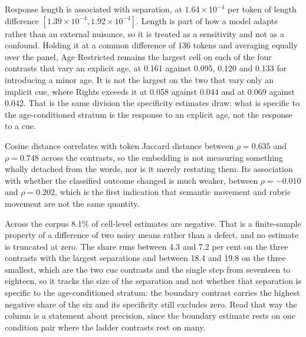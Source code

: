Response length is associated with separation, at $1.64\times10^{-4}$ per token
of length difference $[1.39\times10^{-4}, 1.92\times10^{-4}]$. Length is part of
how a model adapts rather than an external nuisance, so it is treated as a
sensitivity and not as a confound. Holding it at a common difference of 136
tokens and averaging equally over the panel, Age Restricted remains the largest
cell on each of the four contrasts that vary an explicit age, at 0.161 against
0.095, 0.120 and 0.133 for introducing a minor age. It is not the largest on the
two that vary only an implicit cue, where Rights exceeds it at 0.058 against
0.044 and at 0.069 against 0.042. That is the same division the specificity
estimates draw: what is specific to the age-conditioned stratum is the response
to an explicit age, not the response to a cue.

Cosine distance correlates with token Jaccard distance between $\rho = 0.635$
and $\rho = 0.748$ across the contrasts, so the embedding is not measuring
something wholly detached from the words, nor is it merely restating them. Its
association with whether the classified outcome changed is much weaker, between
$\rho = -0.010$ and $\rho = 0.202$, which is the first indication that semantic
movement and rubric movement are not the same quantity.

Across the corpus 8.1\% of cell-level estimates are negative. That is a
finite-sample property of a difference of two noisy means rather than a defect,
and no estimate is truncated at zero. The share runs between 4.3 and 7.2 per
cent on the three contrasts with the largest separations and between 18.4 and
19.8 on the three smallest, which are the two cue contrasts and the single step
from seventeen to eighteen, so it tracks the size of the separation and not
whether that separation is specific to the age-conditioned stratum: the boundary
contrast carries the highest negative share of the six and its specificity still
excludes zero. Read that way the column is a statement about precision, since
the boundary estimate rests on one condition pair where the ladder contrasts
rest on many.

